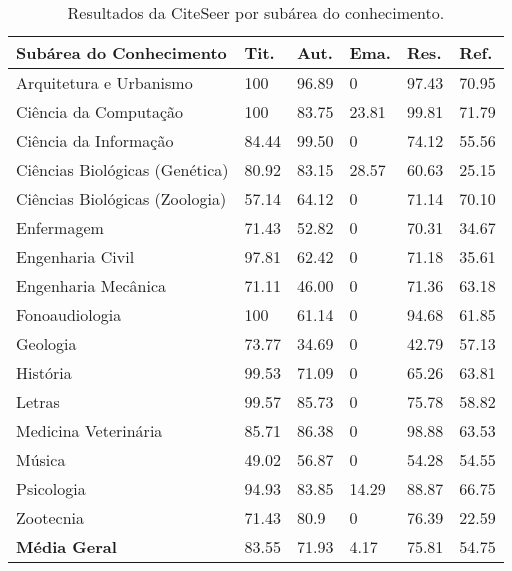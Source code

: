 \begin{table}
    \caption{Resultados da CiteSeer por subárea do conhecimento.}
    \begin{center}
        \begin{tabular}{|p{6cm}|C{1.2cm}|C{1.2cm}|C{1.2cm}|C{1.2cm}|C{1.2cm}|}
            \hline 
            \textbf{Subárea do Conhecimento} & \textbf{Tit.} & \textbf{Aut.} & \textbf{Ema.} & \textbf{Res.} & \textbf{Ref.} \\ \hline 
            Arquitetura e Urbanismo & 100 & 96.89 & 0 & 97.43 & 70.95 \\ \hline
            Ciência da Computação & 100 & 83.75 & 23.81 & 99.81 & 71.79 \\ \hline
            Ciência da Informação & 84.44 & 99.50 & 0 & 74.12 & 55.56 \\ \hline
            Ciências Biológicas (Genética) & 80.92 & 83.15 & 28.57 & 60.63 & 25.15 \\ \hline
            Ciências Biológicas (Zoologia) & 57.14 & 64.12 & 0 & 71.14 & 70.10 \\ \hline
            Enfermagem & 71.43 & 52.82 & 0 & 70.31 & 34.67 \\ \hline
            Engenharia Civil & 97.81 & 62.42 & 0 & 71.18 & 35.61 \\ \hline
            Engenharia Mecânica & 71.11 & 46.00 & 0 & 71.36 & 63.18 \\ \hline
            Fonoaudiologia & 100 & 61.14 & 0 & 94.68 & 61.85 \\ \hline
            Geologia & 73.77 & 34.69 & 0 & 42.79 & 57.13 \\ \hline
            História & 99.53 & 71.09 & 0 & 65.26 & 63.81 \\ \hline
            Letras & 99.57 & 85.73 & 0 & 75.78 & 58.82 \\ \hline
            Medicina Veterinária & 85.71 & 86.38 & 0 & 98.88 & 63.53 \\ \hline
            Música & 49.02 & 56.87 & 0 & 54.28 & 54.55 \\ \hline
            Psicologia & 94.93 & 83.85 & 14.29 & 88.87 & 66.75 \\ \hline
            Zootecnia & 71.43 & 80.9 & 0 & 76.39 & 22.59 \\ \hline
            \textbf{Média Geral} & 83.55 & 71.93 & 4.17 & 75.81 & 54.75 \\ \hline
        \end{tabular}
    \end{center}
    \label{tab:results-citeseer}
\end{table}

